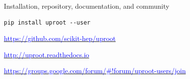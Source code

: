 \documentclass[aspectratio=169]{beamer}
\begin{document}
\begin{frame}[fragile]{Installation, repository, documentation, and community}
\vspace{0.5 cm}
\huge
\begin{center}
\begin{minipage}{0.8\linewidth}
\begin{verbatim}
pip install uproot --user
\end{verbatim}
\end{minipage}

\Large
\vspace{1 cm}
\href{https://github.com/scikit-hep/uproot}{\textcolor{blue}{https://github.com/scikit-hep/uproot}}

\vspace{0.5 cm}
\href{http://uproot.readthedocs.io}{\textcolor{blue}{http://uproot.readthedocs.io}}

\vspace{0.5 cm}
\href{https://groups.google.com/forum/#!forum/uproot-users/join}{\textcolor{blue}{https://groups.google.com/forum/\#!forum/uproot-users/join}}
\end{center}
\end{frame}
\end{document}
